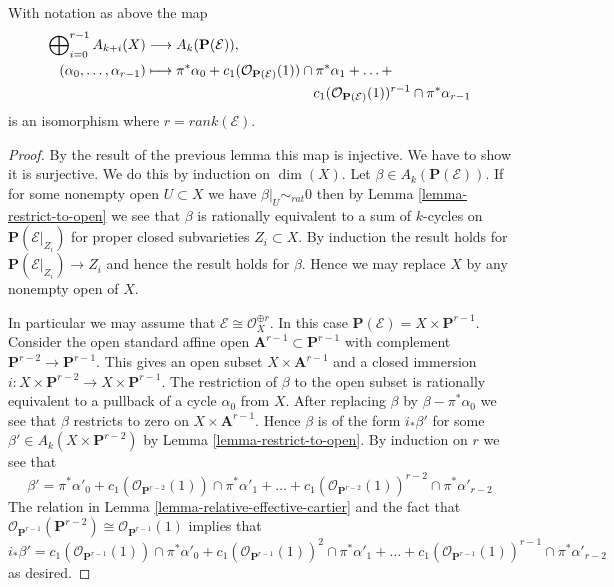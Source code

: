 \begin{lemma}
\label{lemma-chow-ring-projective-bundle}
With notation as above the map
\begin{align*}
\bigoplus\nolimits_{i=0}^{r-1} A_{k + i}(X)
& \longrightarrow
A_k({\bf P}({\mathcal E})), \\
(\alpha_0,\ldots,\alpha_{r-1}) &
\longmapsto
\pi^*\alpha_0 +
c_1(\mathcal{O}_{\mathbf{P}(\mathcal{E})}(1)) \cap \pi^*\alpha_1
+ \ldots + \\
&
\quad \quad \quad \quad
\quad \quad \quad \quad
\quad \quad \quad \quad
c_1(\mathcal{O}_{\mathbf{P}(\mathcal{E})}(1))^{r - 1} \cap \pi^*\alpha_{r-1}
\end{align*}
is an isomorphism where $r = rank({\mathcal E})$.
\end{lemma}

\begin{proof}
By the result of the previous lemma this map is injective.
We have to show it is surjective. We do this by induction
on $\dim(X)$. Let $\beta \in A_k(\mathbf{P}(\mathcal{E}))$.
If for some nonempty open $U \subset X$ we have $\beta|_U \sim_{rat} 0$
then by Lemma \ref{lemma-restrict-to-open} we see that $\beta$
is rationally equivalent to
a sum of $k$-cycles on $\mathbf{P}(\mathcal{E}|_{Z_i})$ for proper
closed subvarieties $Z_i \subset X$. By induction the result holds
for $\mathbf{P}(\mathcal{E}|_{Z_i}) \to Z_i$ and hence the
result holds for $\beta$. Hence we may replace $X$ by any nonempty
open of $X$.

\medskip\noindent
In particular we may assume that $\mathcal{E} \cong \mathcal{O}_X^{\oplus r}$.
In this case $\mathbf{P}(\mathcal{E}) = X \times \mathbf{P}^{r - 1}$.
Consider the open standard affine open
$\mathbf{A}^{r - 1} \subset \mathbf{P}^{r - 1}$ with complement
$\mathbf{P}^{r - 2} \to \mathbf{P}^{r - 1}$.
This gives an open subset $X \times \mathbf{A}^{r - 1}$ and a
closed immersion
$i : X \times \mathbf{P}^{r - 2} \to X \times \mathbf{P}^{r - 1}$.
The restriction of $\beta$ to the open subset is rationally equivalent
to a pullback of a cycle $\alpha_0$ from $X$. After replacing
$\beta$ by $\beta - \pi^*\alpha_0$ we see that $\beta$ restricts
to zero on $X \times \mathbf{A}^{r - 1}$. Hence $\beta$ is
of the form $i_*\beta'$ for some $\beta' \in A_k(X \times \mathbf{P}^{r - 2})$
by Lemma \ref{lemma-restrict-to-open}. By induction on $r$ we see that
$$
\beta' =
\pi^*\alpha'_0 +
c_1(\mathcal{O}_{\mathbf{P}^{r - 2}}(1)) \cap \pi^*\alpha'_1 + \ldots +
c_1(\mathcal{O}_{\mathbf{P}^{r - 2}}(1))^{r - 2} \cap \pi^*\alpha'_{r-2}
$$
The relation in Lemma \ref{lemma-relative-effective-cartier}
and the fact that
$\mathcal{O}_{\mathbf{P}^{r - 1}}(\mathbf{P}^{r - 2})
\cong \mathcal{O}_{\mathbf{P}^{r - 1}}(1)$ implies
that
$$
i_*\beta' =
c_1(\mathcal{O}_{\mathbf{P}^{r - 1}}(1)) \cap \pi^*\alpha'_0 +
c_1(\mathcal{O}_{\mathbf{P}^{r - 1}}(1))^2 \cap \pi^*\alpha'_1 + \ldots +
c_1(\mathcal{O}_{\mathbf{P}^{r - 1}}(1))^{r - 1} \cap \pi^*\alpha'_{r-2}
$$
as desired.
\end{proof}


